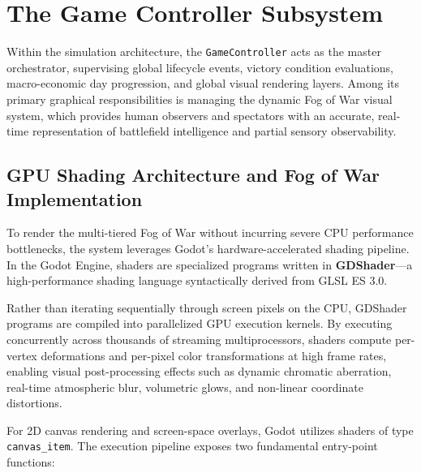 \section{The Game Controller Subsystem}
\label{sec:game_controller_subsystem}

Within the simulation architecture, the \texttt{GameController} acts as the master orchestrator, supervising global lifecycle events, victory condition evaluations, macro-economic day progression, and global visual rendering layers. Among its primary graphical responsibilities is managing the dynamic Fog of War visual system, which provides human observers and spectators with an accurate, real-time representation of battlefield intelligence and partial sensory observability.

\subsection{GPU Shading Architecture and Fog of War Implementation}
\label{subsec:gpu_shaders_fog}

To render the multi-tiered Fog of War without incurring severe CPU performance bottlenecks, the system leverages Godot's hardware-accelerated shading pipeline. In the Godot Engine, shaders are specialized programs written in \textbf{GDShader}—a high-performance shading language syntactically derived from GLSL ES 3.0. 

Rather than iterating sequentially through screen pixels on the CPU, GDShader programs are compiled into parallelized GPU execution kernels. By executing concurrently across thousands of streaming multiprocessors, shaders compute per-vertex deformations and per-pixel color transformations at high frame rates, enabling visual post-processing effects such as dynamic chromatic aberration, real-time atmospheric blur, volumetric glows, and non-linear coordinate distortions.

For 2D canvas rendering and screen-space overlays, Godot utilizes shaders of type \texttt{canvas\_item}. The execution pipeline exposes two fundamental entry-point functions:

